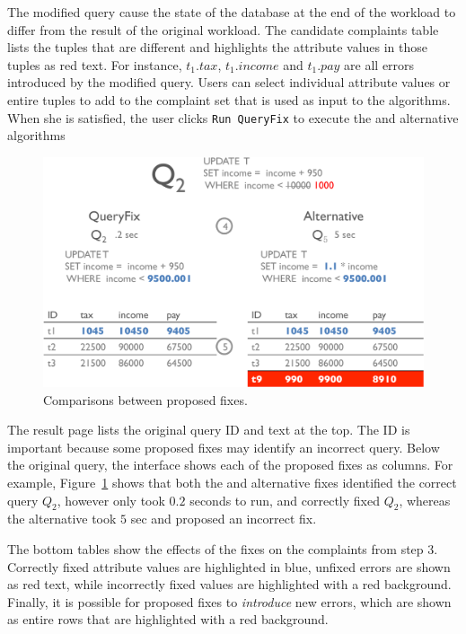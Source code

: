 The modified query cause the state of the database at the end of the workload
to differ from the result of the original workload.  The candidate complaints table lists the tuples
that are different and highlights the attribute values in those tuples as red text.  For instance,
$t_1.tax$, $t_1.income$ and $t_1.pay$ are all errors introduced by the modified query. 
 Users can select individual
attribute values or entire tuples to add to the complaint set that is used as input to the \sys algorithms.  
When she is satisfied, the user clicks \texttt{Run QueryFix} to execute the \sys and alternative algorithms


\begin{figure}[h]
\centering
  \includegraphics[width = .85\columnwidth]{figures/demo2_exp2}
  \caption{Comparisons between proposed fixes.}
  \label{f:demo2} 
\end{figure}

  The result page lists the original query ID and text at the top.  The ID 
is important because some proposed fixes may identify an incorrect query.  Below the original query,
the interface shows each of the proposed fixes as columns.  For example, Figure~\ref{f:demo2} shows 
that both the \sys and alternative fixes identified the correct query $Q_2$, however \sys only took $0.2$ seconds
to run, and correctly fixed $Q_2$, whereas the alternative took $5$ sec and proposed an incorrect fix.

 The bottom tables show the effects of the fixes on the complaints from
step 3.  Correctly fixed attribute values are highlighted in blue, unfixed errors are shown as red text, while incorrectly
fixed values are highlighted with a red background.  Finally, it is possible for proposed fixes to 
{\it introduce} new errors, which are shown as entire rows that are highlighted with a red background.







